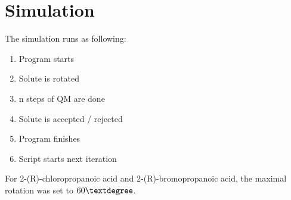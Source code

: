 \documentclass[a4paper,fleqn]{report}
\begin{document}
	\section{Simulation}
	The simulation runs as following:
	\begin{enumerate}
		\setlength{\itemsep}{-1pt}
		\setlength{\parsep}{-1pt}
		\item Program starts
		\item Solute is rotated
		\item n steps of QM are done
		\item Solute is accepted / rejected
		\item Program finishes
		\item Script starts next iteration
	\end{enumerate}
	
	For 2-(R)-chloropropanoic acid and 2-(R)-bromopropanoic acid, the maximal 
	rotation was set to $60 \textdegree$.
	

	\newpage
	\begin{spacing}{0.75}
		\label{Referenties}
		\clearpage
		\renewcommand{\bibname}{Referenties}
		
	\end{spacing}
	
	
\end{document}
